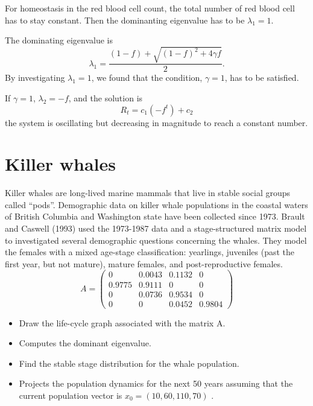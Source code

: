 For homeostasis in the red blood cell count, the total number of red blood cell has to stay constant. Then the dominanting eigenvalue has to be $\lambda_1 =1$.

The dominating eigenvalue is 
$$\lambda_{1}=\frac{(1-f)+ \sqrt{(1-f)^2 + 4 \gamma f}}{2}.$$
By investigating $\lambda _1= 1$, we found that the condition, $\gamma =1$, has to be satisfied.


If $\gamma =1$, $\lambda _2= -f$, and the solution is
$$R_t= c_1 (-f^{t}) +c_2$$
the system is oscillating but decreasing in magnitude to reach a constant number.



\section{Killer whales}
Killer whales are long-lived marine mammals that live in stable
social groups called ``pods''. Demographic
data on killer whale populations in the coastal waters of British Columbia and Washington
state have been collected since 1973. Brault and Caswell (1993) used the 1973-1987 data and
a stage-structured matrix model to investigated several demographic questions concerning the
whales. They model the females with a mixed age-stage classification: yearlings, juveniles (past
the first year, but not mature), mature females, and post-reproductive females. 
$$
A =\left (\begin{array}{cccc}
0 & 0.0043 & 0.1132 & 0\\
0.9775 & 0.9111 & 0 & 0\\
0 & 0.0736 & 0.9534 & 0\\
0 & 0 & 0.0452 & 0.9804
\end{array}\right )$$
\begin{itemize}
\item Draw the life-cycle graph associated with the matrix A.
\item Computes the dominant eigenvalue. 
\item Find the stable stage distribution for the whale population.
\item Projects the population dynamics for the next 50 years assuming that the current population
vector is $x_0 = (10, 60, 110, 70)$ .
\end{itemize}


